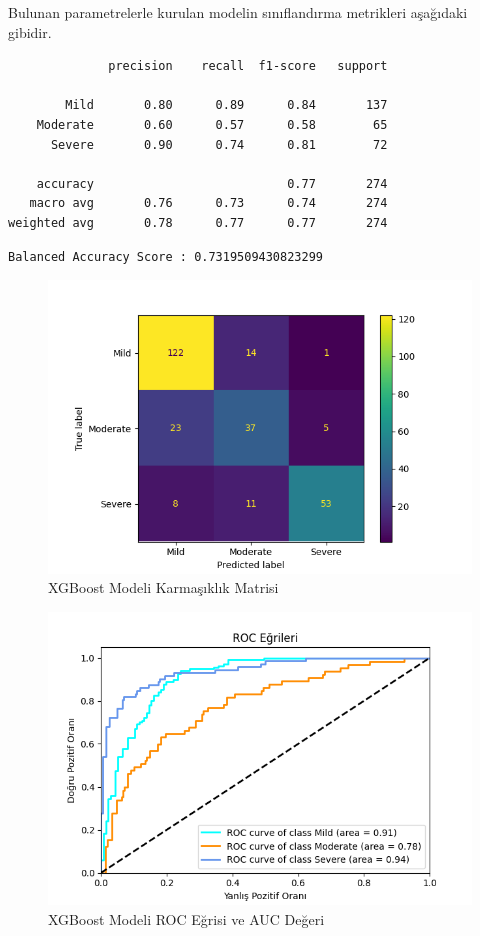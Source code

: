 \documentclass[12pt,twoside]{deuthesis}
\begin{document}
Bulunan parametrelerle kurulan modelin sınıflandırma metrikleri aşağıdaki gibidir.
\begin{verbatim}
              precision    recall  f1-score   support

        Mild       0.80      0.89      0.84       137
    Moderate       0.60      0.57      0.58        65
      Severe       0.90      0.74      0.81        72

    accuracy                           0.77       274
   macro avg       0.76      0.73      0.74       274
weighted avg       0.78      0.77      0.77       274
\end{verbatim}
\begin{verbatim}
Balanced Accuracy Score : 0.7319509430823299
\end{verbatim}
\begin{figure}

{\centering \includegraphics[width=1.05\linewidth,height=0.6\textheight]{figure/xgb_conf} 

}

\caption{XGBoost Modeli Karmaşıklık Matrisi}\label{fig:unnamed-chunk-35}
\end{figure}
\begin{figure}

{\centering \includegraphics[width=1.05\linewidth,height=0.6\textheight]{figure/roc_curve_XGBClassifier} 

}

\caption{XGBoost Modeli ROC Eğrisi ve AUC Değeri}\label{fig:unnamed-chunk-36}
\end{figure}
\end{document}

